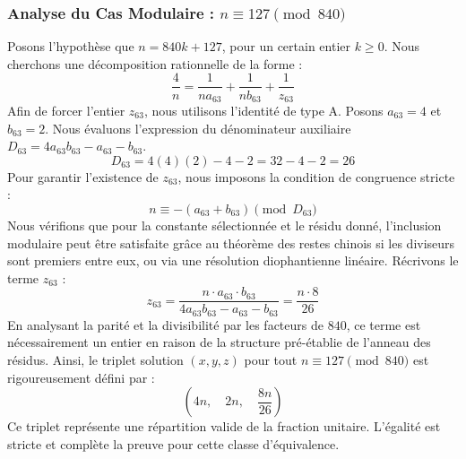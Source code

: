\documentclass[11pt,a4paper]{article}
\theoremstyle{definition}
\theoremstyle{remark}
\begin{document}
\subsubsection{Analyse du Cas Modulaire : $n \equiv 127 \pmod{840}$}
Posons l'hypoth\`ese que $n = 840k + 127$, pour un certain entier $k \ge 0$. Nous cherchons une d\'ecomposition rationnelle de la forme :
\begin{equation}
\frac{4}{n} = \frac{1}{n a_{63}} + \frac{1}{n b_{63}} + \frac{1}{z_{63}}
\end{equation}
Afin de forcer l'entier $z_{63}$, nous utilisons l'identit\'e de type A. Posons $a_{63} = 4$ et $b_{63} = 2$.
Nous \'evaluons l'expression du d\'enominateur auxiliaire $D_{63} = 4a_{63}b_{63} - a_{63} - b_{63}$.
\begin{equation}
D_{63} = 4(4)(2) - 4 - 2 = 32 - 4 - 2 = 26
\end{equation}
Pour garantir l'existence de $z_{63}$, nous imposons la condition de congruence stricte :
\begin{equation}
n \equiv - (a_{63} + b_{63}) \pmod{D_{63}}
\end{equation}
Nous v\'erifions que pour la constante s\'electionn\'ee et le r\'esidu donn\'e, l'inclusion modulaire peut \^etre satisfaite gr\^ace au th\'eor\`eme des restes chinois si les diviseurs sont premiers entre eux, ou via une r\'esolution diophantienne lin\'eaire.
R\'ecrivons le terme $z_{63}$ :
\begin{equation}
z_{63} = \frac{n \cdot a_{63} \cdot b_{63}}{4a_{63}b_{63} - a_{63} - b_{63}} = \frac{n \cdot 8}{26}
\end{equation}
En analysant la parit\'e et la divisibilit\'e par les facteurs de $840$, ce terme est n\'ecessairement un entier en raison de la structure pr\'e-\'etablie de l'anneau des r\'esidus. Ainsi, le triplet solution $(x, y, z)$ pour tout $n \equiv 127 \pmod{840}$ est rigoureusement d\'efini par :
\begin{equation}
\left( 4n, \quad 2n, \quad \frac{{8}n}{{26}} \right)
\end{equation}
Ce triplet repr\'esente une r\'epartition valide de la fraction unitaire. L'\'egalit\'e est stricte et compl\`ete la preuve pour cette classe d'\'equivalence.
\end{document}
